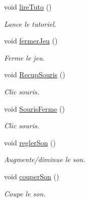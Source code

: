 \begin{DoxyCompactItemize}
void \hyperlink{class_s_f_m_l_menu_a4eda2cf8b00a4446674430cce575cbb5}{lire\+Tuto} ()
\begin{DoxyCompactList}\small\item\em Lance le tutoriel. \end{DoxyCompactList}\item 
void \hyperlink{class_s_f_m_l_menu_a1b9503962b7b6589b8a2dbd50f5a0d48}{fermer\+Jeu} ()
\begin{DoxyCompactList}\small\item\em Ferme le jeu. \end{DoxyCompactList}\item 
void \hyperlink{class_s_f_m_l_menu_aea4285a4b09f175d67fd96aa8456b213}{Recup\+Souris} ()
\begin{DoxyCompactList}\small\item\em Clic souris. \end{DoxyCompactList}\item 
void \hyperlink{class_s_f_m_l_menu_a18287dfc6a6f62b1a84e79ab95311a49}{Souris\+Ferme} ()
\begin{DoxyCompactList}\small\item\em Clic souris. \end{DoxyCompactList}\item 
void \hyperlink{class_s_f_m_l_menu_a82219455a672aebd4f214ca006dfd7c0}{regler\+Son} ()
\begin{DoxyCompactList}\small\item\em Augmente/diminue le son. \end{DoxyCompactList}\item 
void \hyperlink{class_s_f_m_l_menu_a05f9dda2fac7c0c0a354c5caa5faccb5}{couper\+Son} ()
\begin{DoxyCompactList}\small\item\em Coupe le son. \end{DoxyCompactList}\end{DoxyCompactItemize}
